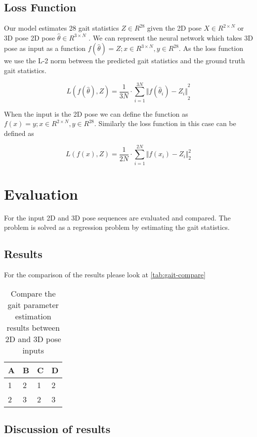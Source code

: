 \subsection{Loss Function}

Our model estimates 28 gait statistics $Z \in R^{28}$ given the 2D pose $X \in R^{2\times N}$ or 3D pose 2D pose $\hat{\theta} \in R^{3\times N}$ . We can represent the neural network which takes 3D pose as input as a function $f(\hat{\theta}) = Z ; x \in R^{3\times N}, y \in R^{28} $. As the loss function we use the L-2 norm between the predicted gait statistics and the ground truth gait statistics.

\begin{equation}	
    L(f(\hat{\theta}),Z) = \frac{1}{3N} \cdot \sum_{i=1}^{3N} {\Vert f(\hat{\theta}_i)-Z_i \Vert}_2^2
\end{equation}

When the input is the 2D pose we can define the function as  $f(x) = y ; x \in R^{2\times N}, y \in R^{28} $. Similarly the loss function in this case can be defined as

\begin{equation}	
    L(f(x),Z) = \frac{1}{2N} \cdot \sum_{i=1}^{2N} {\Vert f(x_i)-Z_i \Vert}_2^2
\end{equation}

\section{Evaluation}

For the input 2D and 3D pose sequences are evaluated and compared. The problem is solved as a regression problem by estimating the gait statistics.

\subsection{Results}

For the comparison of the results please look at \autoref{tab:gait-compare}

\begin{table}[htpb]
    \centering
    \begin{tabular}{l l l l}
        \toprule
            A & B & C & D \\
        \midrule
            1 & 2 & 1 & 2 \\
            2 & 3 & 2 & 3 \\
        \bottomrule
    \end{tabular}
    \caption[Comparison Gait]{Compare the gait parameter estimation results between 2D and 3D pose inputs}\label{tab:gait-compare}
\end{table}

\subsection{Discussion of results}

